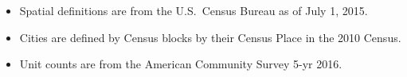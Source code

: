 \begin{itemize}
\item Spatial definitions are from the U.S.~Census Bureau as of July 1, 2015.
\item Cities are defined by Census blocks by their Census Place in the 2010 Census.
\item Unit counts are from the American Community Survey 5-yr 2016.
\end{itemize}
